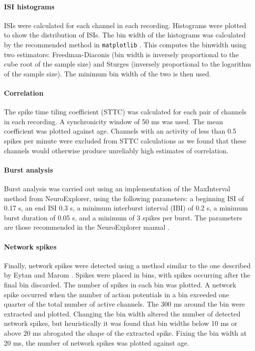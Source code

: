 \documentclass[doublespacing]{bmcart}
\begin{document}
\paragraph{ISI histograms} ISIs were calculated for each channel in each recording. Histograms were plotted to show the distribution of ISIs. The bin width of the histograms was calculated by the recommended method in \texttt{matplotlib} \cite{Community2020-xp}. This computes the binwidth using two estimators: Freedman-Diaconis (bin width is inversely proportional to the cube root of the sample size) and Sturges (inversely proportional to the logarithm of the sample size). The minimum bin width of the two is then used.

\paragraph{Correlation} The spike time tiling coefficient (STTC) \cite{Cutts2014} was calculated for each pair of channels in each recording. A synchronicity window of 50 ms was used. The mean coefficient was plotted against age. Channels with an activity of less than 0.5 spikes per minute were excluded from STTC calculations as we found that these channels would otherwise produce unreliably high estimates of correlation.

\paragraph{Burst analysis} Burst analysis was carried out using an implementation of the MaxInterval method from NeuroExplorer, using the following parameters: a beginning ISI of 0.17 s, an end ISI 0.3 s, a minimum interburst interval (IBI) of 0.2 s, a minimum burst duration of 0.05 s, and a minimum of 3 spikes per burst. The parameters are those recommended in the NeuroExplorer manual \cite{neuroexplorer2020}.

\paragraph{Network spikes} Finally, network spikes were detected using a method similar to the one described by Eytan and Marom \cite{Eytan2006}. Spikes were placed in bins, with spikes occurring after the final bin discarded. The number of spikes in each bin was plotted. A network spike occurred when the number of action potentials in a bin exceeded one quarter of the total number of active channels. The 300 ms around the bin were extracted and plotted. Changing the bin width altered the number of detected network spikes, but heuristically it was found that bin widths below 10 ms or above 20 ms abrogated the shape of the extracted spike. Fixing the bin width at 20 ms, the number of network spikes was plotted against age.
\end{document}
